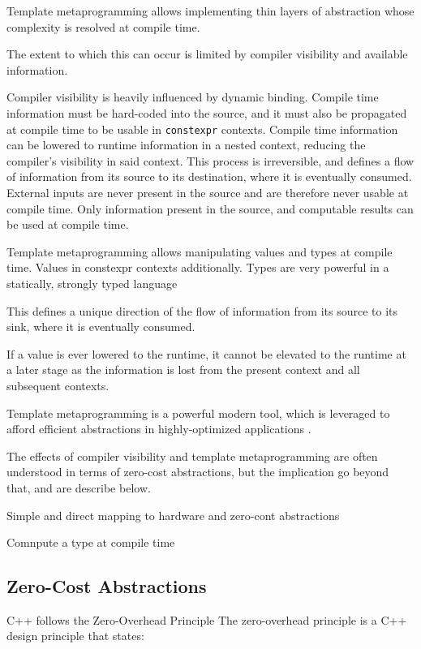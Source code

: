 \documentclass[conference]{IEEEtran}
\begin{document}
Template metaprogramming allows implementing thin layers of
abstraction whose complexity is resolved at compile time.

The extent to which this can occur is limited by compiler visibility and
available information.

Compiler visibility is heavily influenced by dynamic binding.
Compile time information must be hard-coded into the source, and it must also be
propagated at compile time to be usable in \texttt{constexpr} contexts.
Compile time information can be lowered to runtime information in a nested
context, reducing the compiler's visibility in said context.
This process is irreversible, and defines a flow of information from its source
to its destination, where it is eventually consumed.
External inputs are never present in the source and are therefore never usable
at compile time.
Only information present in the source, and computable results can be used at
compile time.

Template metaprogramming allows manipulating values and types at compile time.
Values in constexpr contexts additionally.
Types are very powerful in a statically, strongly typed language

This defines a unique direction of the flow of information from its source to
its sink, where it is eventually consumed.

If a value is ever lowered to the runtime, it cannot be elevated to the runtime
at a later stage as the information is lost from the present context and all
subsequent contexts.

Template metaprogramming is a powerful modern \cpp{} tool, which is leveraged to
afford efficient abstractions in highly-optimized applications \cite{hendricks_lessons_2025}.

The effects of compiler visibility and template metaprogramming are often
understood in terms of zero-cost abstractions, but the implication go beyond
that, and are describe below.

Simple and direct mapping to hardware and zero-cont abstractions
\cite[p.~2]{stroustrup_foundations_2011}


Comnpute a type at compile time
\cite[p.~6]{stroustrup_foundations_2011}


\subsection{Zero-Cost Abstractions}
C++ follows the Zero-Overhead Principle
The zero-overhead principle is a C++ design principle that states:
\end{document}
